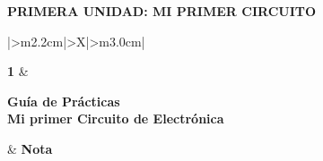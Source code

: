 \documentclass[11pt,a4paper]{article}
\begin{document}
\begin{center}
    {\normalsize\bfseries PRIMERA UNIDAD: MI PRIMER CIRCUITO}
\end{center}

\vspace{0.55cm}

%
\begingroup
\renewcommand{\tabularxcolumn}[1]{m{#1}}
\renewcommand{\arraystretch}{2.0}
\setlength{\tabcolsep}{12pt}
\noindent
\begin{tabularx}{\textwidth}{|>{\centering\arraybackslash}m{2.2cm}|>{\centering\arraybackslash}X|>{\centering\arraybackslash}m{3.0cm}|}
\hline
\rule{0pt}{2.1cm}{\fontsize{58}{58}\selectfont\bfseries 1}
    & \begin{minipage}[c]{\linewidth}\centering
          {\large\bfseries Guía de Prácticas}\\[7pt]
          {\Large\bfseries Mi primer Circuito de Electrónica}
      \end{minipage}
    & {\Large\bfseries Nota}\\
\hline
{}\\
\hline
{}\\
\\
\hline
\end{tabularx}
\endgroup
\end{document}
